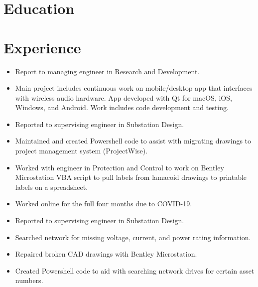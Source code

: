 \documentclass{lsanche_cv}
\begin{document}

\medskip


\smallskip


\begin{multicols*}{2}
  \section{Education}

  \section{Experience}
    \begin{itemize}
      \item Report to managing engineer in Research and Development.
	  \item Main project includes continuous work on mobile/desktop app that interfaces with wireless audio hardware. App developed with Qt for macOS, iOS, Windows, and Android. Work includes code development and testing.
    \end{itemize}

	\divider

    \begin{itemize}
      \item Reported to supervising engineer in Substation Design.
      \item Maintained and created Powershell code to assist with migrating drawings to project management system (ProjectWise).
      \item Worked with engineer in Protection and Control to work on Bentley Microstation VBA script to pull labels from lamacoid drawings to printable labels on a spreadsheet.
      \item Worked online for the full four months due to COVID-19.
    \end{itemize}

    \divider

    \begin{itemize}
      \item Reported to supervising engineer in Substation Design.
      \item Searched network for missing voltage, current, and power rating information.
      \item Repaired broken CAD drawings with Bentley Microstation.
      \item Created Powershell code to aid with searching network drives for certain asset numbers.
    \end{itemize}


\end{multicols*}
\end{document}
